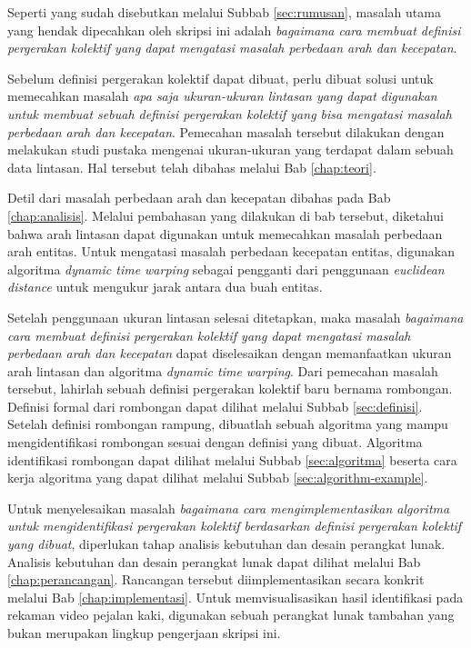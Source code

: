Seperti yang sudah disebutkan melalui Subbab \ref{sec:rumusan}, masalah utama yang hendak dipecahkan oleh skripsi ini adalah \textit{bagaimana cara membuat definisi pergerakan kolektif yang dapat mengatasi masalah perbedaan arah dan kecepatan}.

Sebelum definisi pergerakan kolektif dapat dibuat, perlu dibuat solusi untuk memecahkan masalah \textit{apa saja ukuran-ukuran lintasan yang dapat digunakan untuk membuat sebuah definisi pergerakan kolektif yang bisa mengatasi masalah perbedaan arah dan kecepatan}. Pemecahan masalah tersebut dilakukan dengan melakukan studi pustaka mengenai ukuran-ukuran yang terdapat dalam sebuah data lintasan. Hal tersebut telah dibahas melalui Bab \ref{chap:teori}.

Detil dari masalah perbedaan arah dan kecepatan dibahas pada Bab \ref{chap:analisis}. Melalui pembahasan yang dilakukan di bab tersebut, diketahui bahwa arah lintasan dapat digunakan untuk memecahkan masalah perbedaan arah entitas. Untuk mengatasi masalah perbedaan kecepatan entitas, digunakan algoritma \textit{dynamic time warping} sebagai pengganti dari penggunaan \textit{euclidean distance} untuk mengukur jarak antara dua buah entitas.

Setelah penggunaan ukuran lintasan selesai ditetapkan, maka masalah \textit{bagaimana cara membuat definisi pergerakan kolektif yang dapat mengatasi masalah perbedaan arah dan kecepatan} dapat diselesaikan dengan memanfaatkan ukuran arah lintasan dan algoritma \textit{dynamic time warping}. Dari pemecahan masalah tersebut, lahirlah sebuah definisi pergerakan kolektif baru bernama rombongan. Definisi formal dari rombongan dapat dilihat melalui Subbab \ref{sec:definisi}. Setelah definisi rombongan rampung, dibuatlah sebuah algoritma yang mampu mengidentifikasi rombongan sesuai dengan definisi yang dibuat. Algoritma identifikasi rombongan dapat dilihat melalui Subbab \ref{sec:algoritma} beserta cara kerja algoritma yang dapat dilihat melalui Subbab \ref{sec:algorithm-example}.

Untuk menyelesaikan masalah \textit{bagaimana cara mengimplementasikan algoritma untuk mengidentifikasi pergerakan kolektif berdasarkan definisi pergerakan kolektif yang dibuat}, diperlukan tahap analisis kebutuhan dan desain perangkat lunak. Analisis kebutuhan dan desain perangkat lunak dapat dilihat melalui Bab \ref{chap:perancangan}. Rancangan tersebut diimplementasikan secara konkrit melalui Bab \ref{chap:implementasi}. Untuk memvisualisasikan hasil identifikasi pada rekaman video pejalan kaki, digunakan sebuah perangkat lunak tambahan yang bukan merupakan lingkup pengerjaan skripsi ini.

